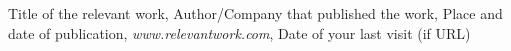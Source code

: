 
\begin{thebibliography}{99}
%


 Title of the relevant work, \newline
  Author/Company that published the work, Place and date of publication, \newline
  \emph{www.relevantwork.com},  \newline
	Date of your last visit (if URL)	
	


\end{thebibliography}
